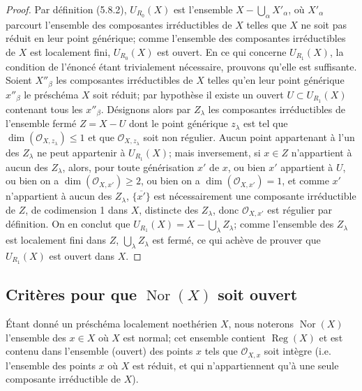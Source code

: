 \begin{proof}
Par définition (5.8.2), $U_{R_0}(X)$ est l'ensemble
$X-\bigcup_\alpha X'_\alpha$, où $X'_\alpha$ parcourt l'ensemble des
composantes irréductibles de $X$ telles que $X$ ne soit pas réduit en leur
point générique; comme l'ensemble des composantes irréductibles de $X$ est
localement fini, $U_{R_0}(X)$ est ouvert. En ce qui concerne $U_{R_1}(X)$,
la condition de l'énoncé étant trivialement nécessaire, prouvons qu'elle est
suffisante. Soient $X''_\beta$ les composantes irréductibles de $X$ telles
qu'en leur point générique $x''_\beta$ le préschéma $X$ soit réduit; par
hypothèse il existe un ouvert $U\subset U_{R_1}(X)$ contenant tous les
$x''_\beta$. Désignons alors par $Z_\lambda$ les composantes irréductibles
de l'ensemble fermé $Z=X-U$ dont le point générique $z_\lambda$ est tel que
$\dim(\mathcal O_{X,z_\lambda})\leq1$ et que
$\mathcal O_{X,z_\lambda}$ soit non régulier. Aucun point appartenant à
l'un des $Z_\lambda$ ne peut appartenir
à $U_{R_1}(X)$; mais inversement, si $x\in Z$ n'appartient à aucun des
$Z_\lambda$, alors, pour toute générisation $x'$ de $x$, ou bien $x'$
appartient à $U$, ou bien on a $\dim(\mathcal O_{X,x'})\geq2$, ou bien on a
$\dim(\mathcal O_{X,x'})=1$, et comme $x'$ n'appartient à aucun des
$Z_\lambda$, $\overline{\{x'\}}$ est nécessairement une composante
irréductible de $Z$, de codimension 1 dans $X$, distincte des $Z_\lambda$,
donc $\mathcal O_{X,x'}$ est régulier par définition. On en conclut que
$U_{R_1}(X)=X-\bigcup_\lambda Z_\lambda$; comme l'ensemble des $Z_\lambda$
est localement fini dans $Z$, $\bigcup_\lambda Z_\lambda$ est fermé, ce qui
achève de prouver que $U_{R_1}(X)$ est ouvert dans $X$.
\end{proof}

\subsection{Critères pour que $\operatorname{Nor}(X)$ soit ouvert}
\label{IV.2.s6.13-fr}

\begin{env}[6.13.1]
\label{IV.2.s6.13.1-fr}
Étant donné un préschéma localement noethérien $X$, nous noterons
$\operatorname{Nor}(X)$ l'ensemble des $x\in X$ où $X$ est normal; cet
ensemble contient $\operatorname{Reg}(X)$ et est contenu dans l'ensemble
(ouvert) des points $x$ tels que $\mathcal O_{X,x}$ soit intègre (i.e.
l'ensemble des points $x$ où $X$ est réduit, et qui n'appartiennent qu'à
une seule composante irréductible de $X$).
\end{env}


